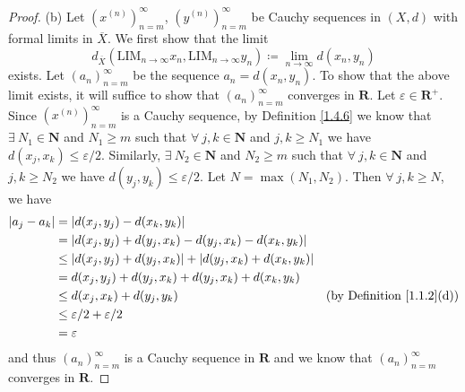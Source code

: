 \begin{proof}{(b)}
    Let \((x^{(n)})_{n = m}^\infty\), \((y^{(n)})_{n = m}^\infty\) be Cauchy sequences in \((X, d)\) with formal limits in \(\overline{X}\).
    We first show that the limit
    \[
        d_{\overline{X}}(\text{LIM}_{n \to \infty} x_n, \text{LIM}_{n \to \infty} y_n) \coloneqq \lim_{n \to \infty} d(x_n, y_n)
    \]
    exists.
    Let \((a_n)_{n = m}^\infty\) be the sequence \(a_n = d(x_n, y_n)\).
    To show that the above limit exists, it will suffice to show that \((a_n)_{n = m}^\infty\) converges in \(\mathbf{R}\).
    Let \(\varepsilon \in \mathbf{R}^+\).
    Since \((x^{(n)})_{n = m}^\infty\) is a Cauchy sequence, by Definition \ref{1.4.6} we know that \(\exists\ N_1 \in \mathbf{N}\) and \(N_1 \geq m\) such that \(\forall\ j, k \in \mathbf{N}\) and \(j, k \geq N_1\) we have \(d(x_j, x_k) \leq \varepsilon / 2\).
    Similarly, \(\exists\ N_2 \in \mathbf{N}\) and \(N_2 \geq m\) such that \(\forall\ j, k \in \mathbf{N}\) and \(j, k \geq N_2\) we have \(d(y_j, y_k) \leq \varepsilon / 2\).
    Let \(N = \max(N_1, N_2)\).
    Then \(\forall\ j, k \geq N\), we have
    \begin{align*}
        \abs*{a_j - a_k} & = \abs*{d(x_j, y_j) - d(x_k, y_k)}                                                                               \\
                         & = \abs*{d(x_j, y_j) + d(y_j, x_k) - d(y_j, x_k) - d(x_k, y_k)}                                                   \\
                         & \leq \abs*{d(x_j, y_j) + d(y_j, x_k)} + \abs*{d(y_j, x_k) + d(x_k, y_k)}                                         \\
                         & = d(x_j, y_j) + d(y_j, x_k) + d(y_j, x_k) + d(x_k, y_k)                                                          \\
                         & \leq d(x_j, x_k) + d(y_j, y_k)                                           & \text{(by Definition \ref{1.1.2}(d))} \\
                         & \leq \varepsilon / 2 + \varepsilon / 2                                                                           \\
                         & = \varepsilon
    \end{align*}
    and thus \((a_n)_{n = m}^\infty\) is a Cauchy sequence in \(\mathbf{R}\) and we know that \((a_n)_{n = m}^\infty\) converges in \(\mathbf{R}\).


\end{proof}
